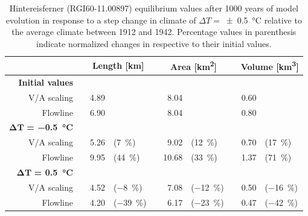     \begin{table}[htp]
      \centering
      \small

      \caption{Hintereisferner (RGI60-11.00897) equilibrium values after 1000 years of model evolution in response to a step change in climate of $\Delta T = $\SI{\pm0.5}{\celsius} relative to the average climate between 1912 and 1942. Percentage values in parenthesis indicate normalized changes in respective to their initial values.}
      \label{tab:hintereisferner_equilibrium_values}
      
      \begin{tabular}{@{}rcrlcrlcrl@{}}
        \toprule
        {} & \phantom{a} & \multicolumn{2}{c}{\textbf{Length [\si{\kilo\meter}]}} & \phantom{a} & \multicolumn{2}{c}{\textbf{Area [\si{\square\kilo\meter}]}} & \phantom{a} & \multicolumn{2}{c}{\textbf{Volume [\si{\cubic\kilo\meter}]}} \\
        \midrule
        \textbf{Initial values} \\
        V/A scaling & \phantom{a} & 4.89 & & \phantom{a} & 8.04 & & \phantom{a} & 0.60 & \\
        Flowline & \phantom{a} &  6.90 & & \phantom{a} & 8.04 & & \phantom{a} & 0.80 & \\
        $\bm{\Delta T}$\textbf{ = \SI{-0.5}{\celsius}} \\
        V/A scaling & \phantom{a} & 5.26 & (\SI{+7}{\percent}) & \phantom{a} & 9.02 & (\SI{+12}{\percent}) & \phantom{a} & 0.70 & (\SI{+17}{\percent}) \\
        Flowline & \phantom{a} &  9.95 & (\SI{+44}{\percent}) & \phantom{a} & 10.68 & (\SI{+33}{\percent}) & \phantom{a} &  1.37 & (\SI{+71}{\percent}) \\
        \addlinespace
        $\bm{\Delta T}$\textbf{ = \SI{+0.5}{\celsius}} \\
        V/A scaling & \phantom{a} & 4.52 & (\SI{-8}{\percent}) & \phantom{a} & 7.08 & (\SI{-12}{\percent}) & \phantom{a} & 0.50 & (\SI{-16}{\percent}) \\
        Flowline & \phantom{a} &   4.20 & (\SI{-39}{\percent}) & \phantom{a} & 6.17 & (\SI{-23}{\percent}) & \phantom{a} & 0.47 & (\SI{-42}{\percent}) \\
        \bottomrule
      \end{tabular}
    \end{table}

